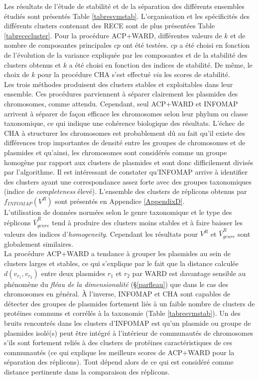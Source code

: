 	  Les résultats de l'étude de stabilité et de la séparation des différents ensembles étudiés sont présentés Table \ref{tabresvmstab}. L'organisation et les spécificités des différents clusters contenant des RECE sont de plus présentées Table \ref{tabrececluster}. Pour la procédure ACP+WARD, différentes valeurs de $k$ et de nombre de composantes principales $cp$ ont été testées. $cp$ a été choisi en fonction de l'évolution de la variance expliquée par les composantes et de la stabilité des clusters obtenus et $k$ a été choisi en fonction des indices de stabilité. De même, le choix de $k$ pour la procédure CHA s'est effectué \textit{via} les scores de stabilité.\\
	   Les trois méthodes produisent des clusters stables et exploitables dans leur ensemble. Ces procédures parviennent à séparer clairement les plasmides des chromosomes, comme attendu. Cependant, seul ACP+WARD et INFOMAP arrivent à séparer de façon efficace les chromosomes selon leur phylum ou classe taxonomique, ce qui indique une cohérence biologique des résultats. L’échec de CHA à structurer les chromosomes est probablement dû au fait qu'il existe des différences trop importantes de densité entre les groupes de chromosomes et de plasmides et qu'ainsi, les chromosomes sont considérés comme un groupe homogène par rapport aux clusters de plasmides et sont donc difficilement divisés par l'algorithme. Il est intéressant de constater qu'INFOMAP arrive à identifier des clusters ayant une correspondance assez forte avec des groupes taxonomiques (indice de \textit{completeness} élevé). L'ensemble des clusters de réplicons obtenus par $f_{INFOMAP}(V^{R})$ sont présentés en Appendice \ref{AppendixD}.\\ L'utilisation de données normées selon le genre taxonomique et le type des réplicons $\bar{V}^{R}_{genre}$  tend à produire des clusters moins stables et à faire baisser les valeurs des indices d'\textit{homogeneity}. Cependant les résultats pour $V^{R}$ et $\bar{V}^{R}_{genre}$ sont globalement similaires.\\
	  La procédure ACP+WARD a tendance à grouper les plasmides au sein de clusters larges et stables, ce qui s'explique par le fait que la distance calculée $d(v_{r_{1}},v_{r_{2}})$ entre deux plasmides $r_{1}$ et $r_{2}$ par WARD est davantage sensible au phénomène du \textit{fléau de la dimensionalité} (\S \ref{parfleau}) que dans le cas des chromosomes en général. À l'inverse, INFOMAP et CHA sont capables de détecter des groupes de plasmides fortement liés à un faible nombre de clusters de protéines communs et corrélés à la taxonomie (Table \ref{tabresvmstab}). Un des bruits rencontrés dans les clusters d'INFOMAP est qu'un plasmide ou groupe de plasmides isolé(s) peut être intégré à l'intérieur de communautés de chromosomes s'ils sont fortement reliés à des clusters de protéines caractéristiques de ces communautés (ce qui explique les meilleurs scores de ACP+WARD pour la séparation des réplicons). Tout dépend alors de ce qui est considéré comme distance pertinente dans la comparaison des réplicons.
 
